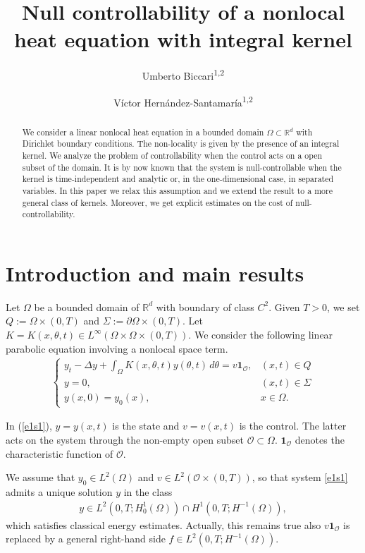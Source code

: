 \documentclass{amsart}    %
\date{}
\title{Null controllability of a nonlocal heat equation with integral kernel}
\author{Umberto Biccari\textsuperscript{1,2}}
\author{V\'ictor Hern\'andez-Santamar\'ia\textsuperscript{1,2}}
\newcommand{\D}{\displaystyle}
\newcommand{\R}{\mathbb{R}}
\begin{document}
           

\maketitle

\begin{abstract}
We consider a linear nonlocal heat equation in a bounded domain $\Omega\subset\R^d$ with Dirichlet boundary conditions. The non-locality is given by the presence of an integral kernel. We analyze the problem of controllability when the control acts on a open subset of the domain. It is by now known that the system is null-controllable when the kernel is time-independent and analytic or, in the one-dimensional case, in separated variables. In this paper we relax this assumption and we extend the result to a more general class of kernels. Moreover, we get explicit estimates on the cost of null-controllability.
\end{abstract}

\section{Introduction and main results}\label{intro_sec}
Let $\Omega$ be a bounded domain of $\R^d$ with boundary of class $C^2$. Given $T>0$, we set $Q:=\Omega\times (0,T)$ and $\Sigma:=\partial\Omega\times (0,T)$. Let $K=K(x,\theta,t)\in L^\infty(\Omega\times\Omega\times(0,T))$.  We consider the following linear parabolic equation involving a nonlocal space term. 
\begin{align}\label{e1s1}
	\begin{cases}
		\D y_t - \Delta y + \int_\Omega K(x,\theta,t)y(\theta,t)\,d\theta = v\mathbf{1}_{\mathcal O}, & (x,t)\in Q
		\\
		y = 0, & (x,t)\in\Sigma
		\\
		y(x,0) = y_0(x), & x\in\Omega.
	\end{cases}
\end{align}

In (\ref{e1s1}), $y=y(x,t)$ is the state and $v=v(x,t)$ is the control. The latter acts on the system through the non-empty open subset ${\mathcal O}\subset\Omega$. $\mathbf{1}_{\mathcal O}$ denotes the characteristic function of $\mathcal O$. 

We assume that $y_0\in L^2(\Omega)$ and $v\in L^2(\mathcal O\times(0,T))$, so that system \eqref{e1s1} admits a unique solution $y$ in the class
\begin{align*}
	y\in L^2(0,T;H^{1}_{0}(\Omega))\cap H^1(0,T;H^{-1}(\Omega)),
\end{align*}
which satisfies classical energy estimates. Actually, this remains true also $v\mathbf{1}_{\mathcal O}$ is replaced by a general right-hand side $f\in L^2(0,T;H^{-1}(\Omega))$.
\end{document}
